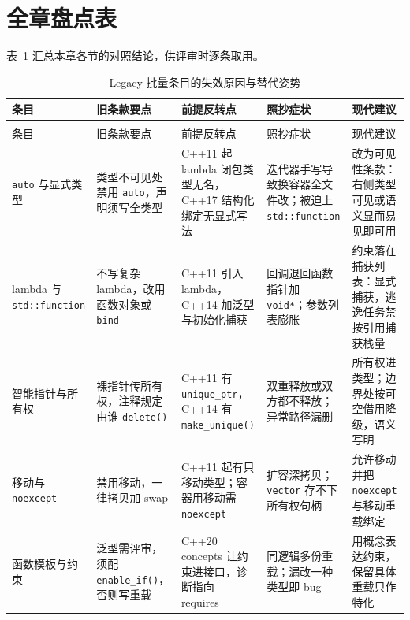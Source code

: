 \documentclass[12pt,a4paper,fontset=fandol]{ctexbook}
\newcommand{\cpp}[1]{C++#1}
\newcommand{\Fn}[1]{\texttt{#1()}}
\newcommand{\Tp}[1]{\texttt{#1}}
\newcommand{\Bk}{\discretionary{}{}{}}
\newcommand{\Lang}[1]{\textsf{#1}}
\newcommand{\DomTra}{\Lang{Legacy}}
\begin{document}
\section{全章盘点表}
\label{sec:ch12-table}

表~\ref{tab:ch12-stale} 汇总本章各节的对照结论，供评审时逐条取用。

\begin{longtable}{>{\raggedright\arraybackslash}p{}
                >{\raggedright\arraybackslash}p{}
                >{\raggedright\arraybackslash}p{}
                >{\raggedright\arraybackslash}p{}
                >{\raggedright\arraybackslash}p{}}
\caption{\DomTra{} 批量条目的失效原因与替代姿势}\label{tab:ch12-stale}\\
\toprule
条目 & 旧条款要点 & 前提反转点 & 照抄症状 & 现代建议 \\
\midrule
\endfirsthead

\multicolumn{5}{r}{（续表~\ref{tab:ch12-stale}）}\\
\toprule
条目 & 旧条款要点 & 前提反转点 & 照抄症状 & 现代建议 \\
\midrule
\endhead
\bottomrule
\endfoot

\Tp{auto} 与显式类型 &
类型不可见处禁用 \Tp{auto}，声明须写全类型 &
\cpp{11} 起 lambda 闭包类型无名，\cpp{17} 结构化绑定无显式写法 &
迭代器手写导致换容器全文件改；被迫上 \Tp{std::{\Bk}function} &
改为可见性条款：右侧类型可见或语义显而易见即可用 \\

lambda 与 \Tp{std::{\Bk}function} &
不写复杂 lambda，改用函数对象或 \Tp{bind} &
\cpp{11} 引入 lambda，\cpp{14} 加泛型与初始化捕获 &
回调退回函数指针加 \Tp{void*}；参数列表膨胀 &
约束落在捕获列表：显式捕获，逃逸任务禁按引用捕获栈量 \\

智能指针与所有权 &
裸指针传所有权，注释规定由谁 \Fn{delete} &
\cpp{11} 有 \Tp{unique\_ptr}，\cpp{14} 有 \Fn{make\_unique} &
双重释放或双方都不释放；异常路径漏删 &
所有权进类型；边界处按可空借用降级，语义写明 \\

移动与 \Tp{noexcept} &
禁用移动，一律拷贝加 swap &
\cpp{11} 起有只移动类型；容器用移动需 \Tp{noexcept} &
扩容深拷贝；\Tp{vector} 存不下所有权句柄 &
允许移动并把 \Tp{noexcept} 与移动重载绑定 \\

函数模板与约束 &
泛型需评审，须配 \Fn{enable\_if}，否则写重载 &
\cpp{20} concepts 让约束进接口，诊断指向 requires &
同逻辑多份重载；漏改一种类型即 bug &
用概念表达约束，保留具体重载只作特化 \\


\end{longtable}
\end{document}
